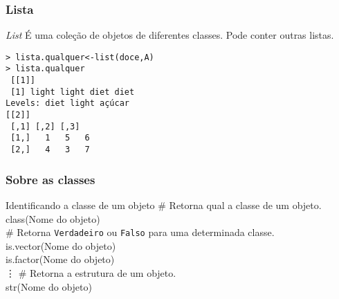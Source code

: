 \documentclass{beamer}
\begin{document}
  \begin{frame}
    \frametitle{Lista}
    \begin{block}{\textit{List}}
        É uma coleção de objetos de diferentes classes. Pode conter outras listas.     
    \end{block}
\texttt{> lista.qualquer<-list(doce,A)\\
  > lista.qualquer \\
 ~[[1]]\\
~[1] light light diet  diet \\
Levels: diet light açúcar\\
\vspace{10pt}
[[2]]\\
  \hspace{20pt} ~[,1]~[,2]~[,3]\\
~[1,]  ~  1  ~  5 ~   6\\
~[2,]  ~  4 ~   3  ~  7}
  \end{frame}
  \begin{frame}
    \frametitle{Sobre as classes}
    \begin{block}{Identificando a classe de um objeto}
      \# Retorna qual a classe de um objeto.\\
      class(Nome do objeto)\\ \vspace{10pt}
      \# Retorna \texttt{Verdadeiro} ou \texttt{Falso} para uma determinada classe. \\
       is.vector(Nome do objeto)\\
       is.factor(Nome do objeto)\\
        \vdots 
         \vspace{10pt}
        \# Retorna a estrutura de um objeto.\\
         str(Nome do objeto)
    \end{block}
  \end{frame}
\end{document}
